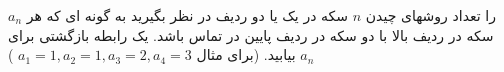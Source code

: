 \exercise
$a_n$
را تعداد روشهای چیدن
$n$
سکه در یک یا دو ردیف در نظر بگیرید به گونه ای که هر سکه در ردیف بالا با دو سکه در ردیف پایین در تماس باشد. یک رابطه بازگشتی برای
$a_n$
بیابید. (برای مثال 
$a_1 = 1, a_2 = 1, a_3 = 2, a_4 = 3$
)